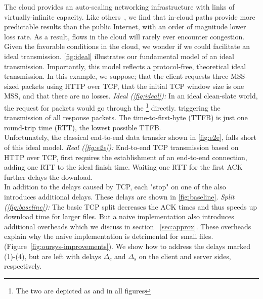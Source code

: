 
The cloud provides an auto-scaling networking infrastructure with links of virtually-infinite capacity. Like others~\cite{haq2017measuring}, we find that in-cloud paths provide more predictable results than the public Internet, with an order of magnitude lower loss rate. As a result, flows in the cloud will rarely ever encounter congestion. Given the favorable conditions in the cloud, we wonder if we could facilitate an ideal transmission. \autoref{fig:ideal} illustrates our fundamental model of an ideal transmission. Importantly, this model reflects a protocol-free, theoretical ideal transmission.
In this example, we suppose; that the client requests three MSS-sized packets using HTTP over TCP, that the initial TCP window size is one MSS, and that there are no losses.
 \textit{Ideal (\autoref{fig:ideal}):} In an ideal clean-slate world, the request for packets would go through the \relays\footnote{The two \relays are depicted as \rc and \rs in all figures} directly.  triggering the transmission of all response packets. The time-to-first-byte (TTFB) is just one round-trip time (RTT), the lowest possible TTFB.\\
Unfortunately, the classical end-to-end data transfer shown in \autoref{fig:e2e}, falls short of this ideal model.
 \textit{Real (\autoref{fig:e2e}):} End-to-end TCP transmission based on HTTP over TCP, first requires the establishment of an end-to-end connection, adding one RTT to the ideal finish time. Waiting one RTT for the first ACK further delays the download.\\ 
In addition to the delays caused by TCP, each "stop" on one of the \relays also introduces additional delays. These delays are shown in \autoref{fig:baseline}.
\textit{Split (\autoref{fig:baseline}): } The basic TCP split decreases the ACK times and thus speeds up download time for larger files. But a naive implementation also introduces additional overheads which we discuss in section ~\ref{sec:approx}. These overheads explain why the naive implementation is detrimental for small files.  (Figure~\ref{fig:oursys-improvements}). We show how to address the delays marked (1)-(4), but are left with delays $\Delta_c$ and $\Delta_s$ on the client and server sides, respectively.

